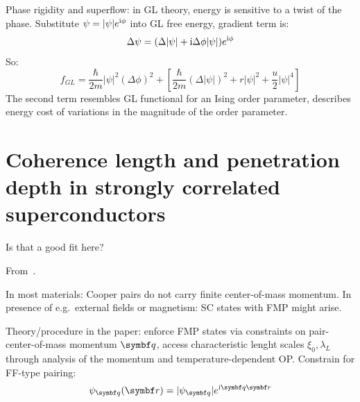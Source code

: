 \documentclass[../notes.tex]{subfiles}
\begin{document}
Phase rigidity and superflow: in GL theory, energy is sensitive to a twist of the phase.
Substitute \(\psi = \vert \psi \vert e^{\mathrm{i} \phi}\) into GL free energy, gradient term is:
\begin{equation}
	\Delta \psi = (\Delta \vert \psi \vert + \mathrm{i} \Delta \phi \vert \psi \vert) e^{\mathrm{i} \phi}
\end{equation}
So:
\begin{equation}
	f_{GL}  = \frac{\hbar}{2m} \vert \psi \vert^2 (\Delta \phi)^2 + \left[ \frac{\hbar}{2m} (\Delta \vert \psi \vert)^2 + r \vert \psi \vert^2 + \frac{u}{2} \vert \psi \vert^4 \right]
\end{equation}
The second term resembles GL functional for an Ising order parameter, describes energy cost of variations in the magnitude of the order parameter.



\section{Coherence length and penetration depth in strongly correlated superconductors}\label{sec:coherence length in strongly correlated superconductors}

Is that a good fit here?

From~\cite{wittBypassingLatticeBCSBEC2024}.

In most materials: Cooper pairs do not carry finite center-of-mass momentum.
In presence of e.g.\ external fields or magnetism: SC states with FMP might arise.

Theory/procedure in the paper: enforce FMP states via constraints on pair-center-of-mass momentum \(\vb{q}\), access characteristic lenght scales \(\xi_0, \lambda_L\) through analysis of the momentum and temperature-dependent OP\@.
Constrain for FF-type pairing:
\begin{equation}
	\psi_{\vb{q}} (\vb{r}) = \vert \psi_{\vb{q}} \vert e^{\iu \vb{q} \vb{r}}
\end{equation}

\end{document}
